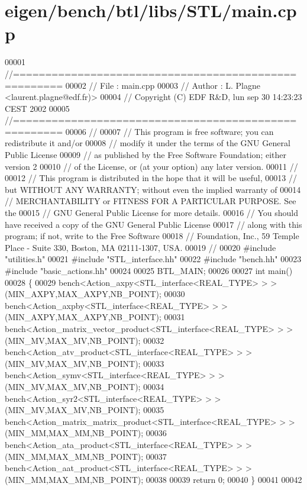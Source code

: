 \hypertarget{eigen_2bench_2btl_2libs_2_s_t_l_2main_8cpp_source}{}\section{eigen/bench/btl/libs/\+S\+T\+L/main.cpp}
\label{eigen_2bench_2btl_2libs_2_s_t_l_2main_8cpp_source}

\begin{DoxyCode}
00001 \textcolor{comment}{//=====================================================}
00002 \textcolor{comment}{// File   :  main.cpp}
00003 \textcolor{comment}{// Author :  L. Plagne <laurent.plagne@edf.fr)>}
00004 \textcolor{comment}{// Copyright (C) EDF R&D,  lun sep 30 14:23:23 CEST 2002}
00005 \textcolor{comment}{//=====================================================}
00006 \textcolor{comment}{//}
00007 \textcolor{comment}{// This program is free software; you can redistribute it and/or}
00008 \textcolor{comment}{// modify it under the terms of the GNU General Public License}
00009 \textcolor{comment}{// as published by the Free Software Foundation; either version 2}
00010 \textcolor{comment}{// of the License, or (at your option) any later version.}
00011 \textcolor{comment}{//}
00012 \textcolor{comment}{// This program is distributed in the hope that it will be useful,}
00013 \textcolor{comment}{// but WITHOUT ANY WARRANTY; without even the implied warranty of}
00014 \textcolor{comment}{// MERCHANTABILITY or FITNESS FOR A PARTICULAR PURPOSE.  See the}
00015 \textcolor{comment}{// GNU General Public License for more details.}
00016 \textcolor{comment}{// You should have received a copy of the GNU General Public License}
00017 \textcolor{comment}{// along with this program; if not, write to the Free Software}
00018 \textcolor{comment}{// Foundation, Inc., 59 Temple Place - Suite 330, Boston, MA  02111-1307, USA.}
00019 \textcolor{comment}{//}
00020 \textcolor{preprocessor}{#include "utilities.h"}
00021 \textcolor{preprocessor}{#include "STL\_interface.hh"}
00022 \textcolor{preprocessor}{#include "bench.hh"}
00023 \textcolor{preprocessor}{#include "basic\_actions.hh"}
00024 
00025 BTL\_MAIN;
00026 
00027 \textcolor{keywordtype}{int} main()
00028 \{
00029   bench<Action\_axpy<STL\_interface<REAL\_TYPE> > >(MIN\_AXPY,MAX\_AXPY,NB\_POINT);
00030   bench<Action\_axpby<STL\_interface<REAL\_TYPE> > >(MIN\_AXPY,MAX\_AXPY,NB\_POINT);
00031   bench<Action\_matrix\_vector\_product<STL\_interface<REAL\_TYPE> > >(MIN\_MV,MAX\_MV,NB\_POINT);
00032   bench<Action\_atv\_product<STL\_interface<REAL\_TYPE> > >(MIN\_MV,MAX\_MV,NB\_POINT);
00033   bench<Action\_symv<STL\_interface<REAL\_TYPE> > >(MIN\_MV,MAX\_MV,NB\_POINT);
00034   bench<Action\_syr2<STL\_interface<REAL\_TYPE> > >(MIN\_MV,MAX\_MV,NB\_POINT);
00035   bench<Action\_matrix\_matrix\_product<STL\_interface<REAL\_TYPE> > >(MIN\_MM,MAX\_MM,NB\_POINT);
00036   bench<Action\_ata\_product<STL\_interface<REAL\_TYPE> > >(MIN\_MM,MAX\_MM,NB\_POINT);
00037   bench<Action\_aat\_product<STL\_interface<REAL\_TYPE> > >(MIN\_MM,MAX\_MM,NB\_POINT);
00038 
00039   \textcolor{keywordflow}{return} 0;
00040 \}
00041 
00042 
\end{DoxyCode}
